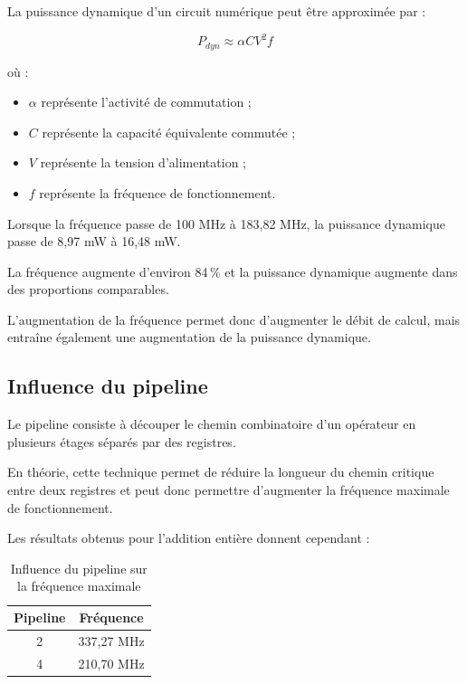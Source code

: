 \documentclass[12pt,a4paper]{article}
\begin{document}
La puissance dynamique d'un circuit numérique peut être
approximée par :

\begin{equation}
    P_{dyn} \approx \alpha C V^2 f
\end{equation}

où :

\begin{itemize}
    \item $\alpha$ représente l'activité de commutation ;
    \item $C$ représente la capacité équivalente commutée ;
    \item $V$ représente la tension d'alimentation ;
    \item $f$ représente la fréquence de fonctionnement.
\end{itemize}

Lorsque la fréquence passe de 100 MHz à 183,82 MHz,
la puissance dynamique passe de 8,97 mW à 16,48 mW.

La fréquence augmente d'environ 84\,\% et la puissance dynamique
augmente dans des proportions comparables.

L'augmentation de la fréquence permet donc d'augmenter le débit
de calcul, mais entraîne également une augmentation de la
puissance dynamique.



\subsection{Influence du pipeline}

Le pipeline consiste à découper le chemin combinatoire d'un
opérateur en plusieurs étages séparés par des registres.

En théorie, cette technique permet de réduire la longueur du
chemin critique entre deux registres et peut donc permettre
d'augmenter la fréquence maximale de fonctionnement.

Les résultats obtenus pour l'addition entière donnent cependant :

\begin{table}[H]
    \centering

    \caption{Influence du pipeline sur la fréquence maximale}

    \begin{tabular}{cc}
        \toprule

        \textbf{Pipeline} &
        \textbf{Fréquence} \\

        \midrule

        2 & 337,27 MHz \\
        4 & 210,70 MHz \\

        \bottomrule
    \end{tabular}
\end{table}
\end{document}
